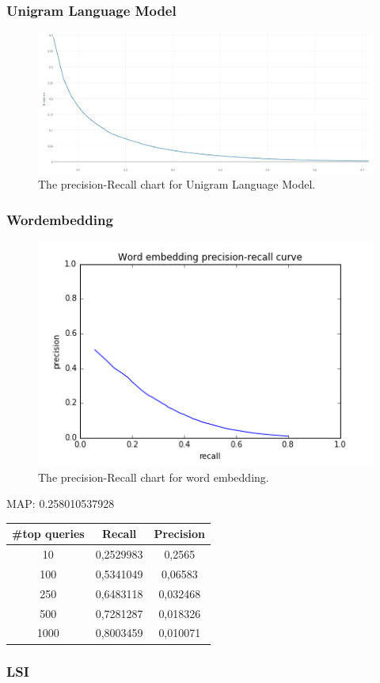 \subsubsection{Unigram Language Model}
\begin{figure}[H]
	\centering
	\includegraphics[width=130mm]{images/uniresult0.jpg}
	\caption{The precision-Recall chart for Unigram Language Model.}
	\label{fig:uniresult0}
\end{figure}


\subsubsection{Wordembedding}
\begin{figure}[H]
	\centering
	\includegraphics[width=130mm]{images/precision-recall_embedding.png}
	\caption{The precision-Recall chart for word embedding.}
	\label{fig:embeddingpresicionrecall}
\end{figure}
MAP: 0.258010537928
\begin{table}[H]
	\centering
    \begin{tabular}{| c | c | c |}
        \hline
        \textbf{\#top queries} & \textbf{Recall} & \textbf{Precision}\\ \hline
        10   & 0,2529983  & 0,2565 \\
        100  & 0,5341049  & 0,06583 \\
        250  & 0,6483118  & 0,032468  \\
        500  & 0,7281287  & 0,018326 \\
        1000 & 0,8003459  & 0,010071 \\
        \hline
    \end{tabular}
\end{table}

\subsubsection{LSI}
